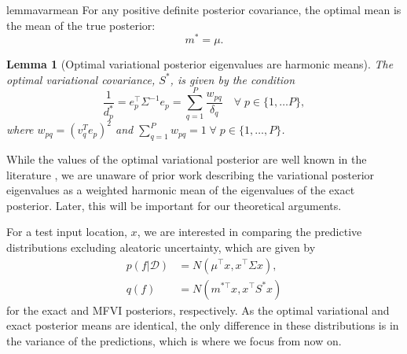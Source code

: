\documentclass{article}
\theoremstyle{plain}
\newtheorem{lemma}[theorem]{Lemma}
\theoremstyle{definition}
\theoremstyle{remark}
\theoremstyle{plain}
\newcommand{\data}{\mathcal{D}}
\newcommand{\posterior}{\Sigma}
\begin{document}
\begin{restatable}{lemma}{varmean}
\label{lemma:optimal_var_mean}
    For any positive definite posterior covariance, the optimal mean is the mean of the true posterior: 
    \begin{equation} \label{eq:mfvi_optimal_mean}
        m^* = \mu.
    \end{equation}
\end{restatable}

\begin{lemma} [Optimal variational posterior eigenvalues are harmonic means] \label{th:MFVI-hm}
    The optimal variational covariance, $S^*$, is given by the condition
    \begin{equation} \label{eq:mfvi_optimal_cov}
        \frac{1}{d_p^*} = {e_p^\top \posterior^{-1} e_p} = {\sum_{q=1}^P \frac{w_{pq}}{\delta_q}} \quad \forall \; p \in \{1, \dots P\},
    \end{equation}
    where $w_{pq} = (v_q^T e_p)^2$ and  $\sum_{q=1}^P w_{pq} = 1 \; \forall \; p \in \{1, \dots, P\}$.
\end{lemma}
While the values of the optimal variational posterior are well known in the literature \citep{Turner_Sahani_2011, margossian2023shrinkage}, we are unaware of prior work describing the variational posterior eigenvalues as a weighted harmonic mean of the eigenvalues of the exact posterior. Later, this will be important for our theoretical arguments. 



For a test input location, $x$, we are interested in comparing the predictive distributions excluding aleatoric uncertainty, which are given by 
\begin{equation}
\begin{split}
    p(f| \data) &= N(\mu^\top x, x^\top \posterior x ),
    \\q(f) &= N(m^{* \top} x, x^\top S^* x )
\end{split}
\end{equation}
 for the exact and MFVI posteriors, respectively. As the optimal variational and exact posterior means are identical, the only difference in these distributions is in the variance of the predictions, which is where we focus from now on. 
\end{document}
